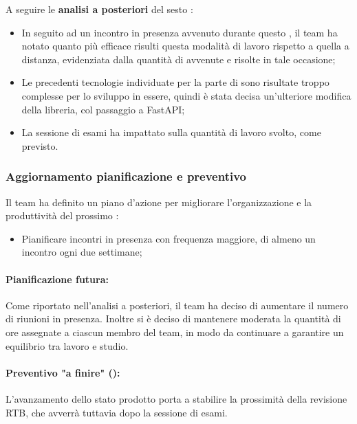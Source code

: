 \vspace{0.5\baselineskip}
\par A seguire le \textbf{analisi a posteriori} del sesto :
\begin{itemize}
  \item In seguito ad un incontro in presenza avvenuto durante questo , il team ha notato quanto più efficace risulti questa modalità di lavoro rispetto a quella a distanza, evidenziata dalla quantità di  avvenute e risolte in tale occasione;
  \item Le precedenti tecnologie individuate per la parte di  sono risultate troppo complesse per lo sviluppo in essere, quindi è stata decisa un'ulteriore modifica della libreria, col passaggio a FastAPI;
  \item La sessione di esami ha impattato sulla quantità di lavoro svolto, come previsto.
\end{itemize}

\subsubsection{Aggiornamento pianificazione e preventivo}
\par Il team ha definito un piano d'azione per migliorare l'organizzazione e la produttività del prossimo :
\begin{itemize}
  \item Pianificare incontri in presenza con frequenza maggiore, di almeno un incontro ogni due settimane;
\end{itemize}

\paragraph*{Pianificazione futura:}
\par Come riportato nell'analisi a posteriori, il team ha deciso di aumentare il numero di riunioni in presenza.
Inoltre si è deciso di mantenere moderata la quantità di ore assegnate a ciascun membro del team, in modo da continuare a garantire un equilibrio tra lavoro e studio.

\paragraph*{Preventivo "a finire" ():}
\par L'avanzamento dello stato prodotto porta a stabilire la prossimità della revisione RTB, che avverrà tuttavia dopo la sessione di esami.

